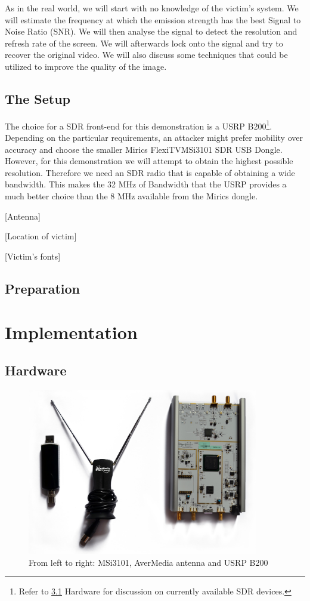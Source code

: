 \documentclass[a4paper,12pt,twoside,openright]{report}
\begin{document}
As in the real world, we will start with no knowledge of the victim's system. We will estimate the frequency at which the emission strength has the best Signal to Noise Ratio (SNR). We will then analyse the signal to detect the resolution and refresh rate of the screen. We will afterwards lock onto the signal and try to recover the original video. We will also discuss some techniques that could be utilized to improve the quality of the image.

\section{The Setup}

The choice for a SDR front-end for this demonstration is a USRP B200\footnote{Refer to \ref{sec:hw} Hardware for discussion on currently available SDR devices.}. Depending on the particular requirements, an attacker might prefer mobility over accuracy and choose the smaller Mirics FlexiTV\texttrademark MSi3101 SDR USB Dongle. However, for this demonstration we will attempt to obtain the highest possible resolution. Therefore we need an SDR radio that is capable of obtaining a wide bandwidth. This makes the 32 MHz of Bandwidth that the USRP provides a much better choice than the 8 MHz available from the Mirics dongle.

[Antenna]

[Location of victim]

[Victim's fonts]

\section{Preparation}

\chapter{Implementation} 

\section{Hardware}
\label{sec:hw} 

\begin{figure}[h!]
 
  \centering
    \includegraphics[width=0.9\textwidth]{equipment}
    \caption{From left to right: MSi3101, AverMedia antenna and USRP B200}
\end{figure}
\end{document}
